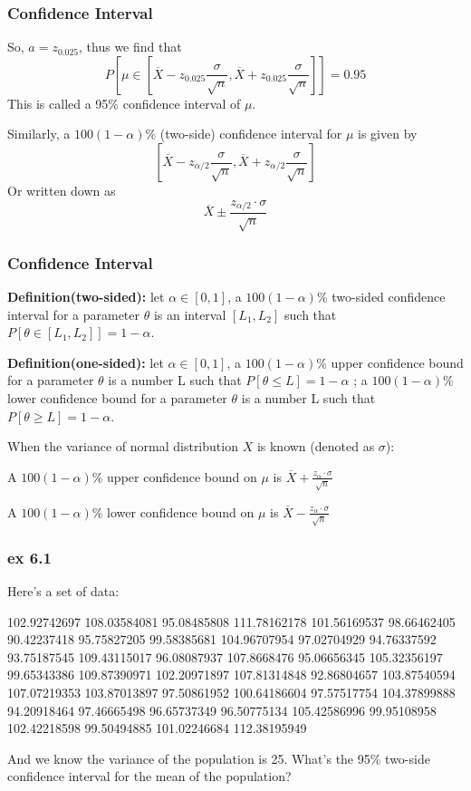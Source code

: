 \documentclass{beamer}
\begin{document}
\begin{frame}
    \frametitle{Confidence Interval}

    So, $a=z_{0.025}$, thus we find that
    \[P[\mu\in [\overline{X} -z_{0.025} \frac{\sigma}{\sqrt{n}},\overline{X}+ z_{0.025} \frac{\sigma}{\sqrt{n}}]]=0.95\]
    This is called a 95\% confidence interval of $\mu$.\par

    Similarly, a $100(1-\alpha)\%$ (two-side) confidence interval for $\mu$ is given by
    \[[\overline{X} -z_{\alpha/2} \frac{\sigma}{\sqrt{n}},\overline{X}+ z_{\alpha/2} \frac{\sigma}{\sqrt{n}}]\]
    Or written down as
    \[\overline{X}\pm\frac{z_{\alpha/2}\cdot\sigma}{\sqrt{n}}\]

\end{frame}

\begin{frame}
    \frametitle{Confidence Interval}
    \textbf{Definition(two-sided):} let $\alpha\in[0,1]$, a $100(1-\alpha)\%$ two-sided confidence interval for a parameter $\theta$ is an interval $[L_1,L_2]$ such that $P[\theta\in[L_1,L_2]]=1-\alpha$.\par
    \textbf{Definition(one-sided):} let $\alpha\in[0,1]$, a $100(1-\alpha)\%$ upper confidence bound for a parameter $\theta$ is a number L such that $P[\theta\leq L]=1-\alpha$ ; a $100(1-\alpha)\%$ lower confidence bound for a parameter $\theta$ is a number L such that $P[\theta\geq L]=1-\alpha$.\par
    When the variance of normal distribution $X$ is known (denoted as $\sigma$): \par
    A $100(1-\alpha)\%$ upper confidence bound on $\mu$ is $\overline{X}+\frac{z_{\alpha}\cdot\sigma}{\sqrt{n}}$

    A $100(1-\alpha)\%$ lower confidence bound on $\mu$ is $\overline{X}-\frac{z_{\alpha}\cdot\sigma}{\sqrt{n}}$

\end{frame}

\begin{frame}
    \frametitle{ex 6.1}
    Here's a set of data:\par
    102.92742697 108.03584081  95.08485808 111.78162178 101.56169537
  98.66462405  90.42237418  95.75827205  99.58385681 104.96707954
  97.02704929  94.76337592  93.75187545 109.43115017  96.08087937
 107.8668476   95.06656345 105.32356197  99.65343386 109.87390971
 102.20971897 107.81314848  92.86804657 103.87540594 107.07219353
 103.87013897  97.50861952 100.64186604  97.57517754 104.37899888
  94.20918464  97.46665498  96.65737349  96.50775134 105.42586996
  99.95108958 102.42218598  99.50494885 101.02246684 112.38195949\par
  And we know the variance of the population is 25. What's the 95\% two-side confidence interval for the mean of the population?

\end{frame}
\end{document}
